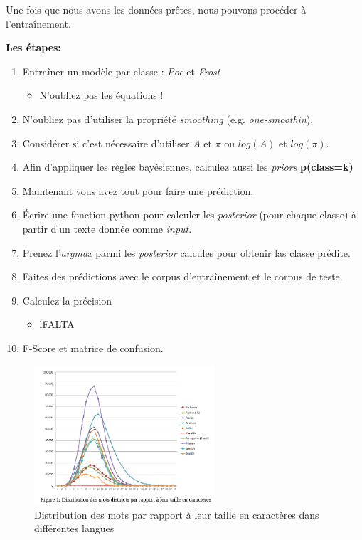 \vspace{0.5cm}
Une fois que nous avons les données prêtes, nous pouvons procéder à l'entraînement.

\vspace{0.5cm}
\textbf{Les étapes:}

\begin{enumerate}
	\item Entraîner un modèle par classe : \textit{Poe} et \textit{Frost}
	\begin{itemize}
		\item N'oubliez pas les équations !
	\end{itemize}
	\item N'oubliez pas d'utiliser la propriété \textit{smoothing} (e.g. \textit{one-smoothin}). 
	\item Considérer si c'est nécessaire d'utiliser $A$ et $\pi$ ou $log(A)$ et $log(\pi)$.
	\item Afin d'appliquer les règles bayésiennes, calculez aussi les \textit{priors} \textbf{p(class=k)}
	\item Maintenant vous avez tout pour faire une prédiction.
	\item Écrire une fonction python pour calculer les \textit{posterior} (pour chaque classe) à partir d'un texte donnée comme \textit{input}.
	\item Prenez l'\textit{argmax} parmi les \textit{posterior} calcules pour obtenir las classe prédite.
	\item Faites des prédictions avec le corpus d'entraînement et le corpus de teste.
	\item Calculez la précision 
	\begin{itemize}
		\item lFALTA
	\end{itemize}
	\item F-Score et matrice de confusion.
	
\end{enumerate}

\begin{figure}[h]
\includegraphics[width=0.6\textwidth]{../images/distrib.png}
\caption{Distribution des mots par rapport à leur taille en caractères dans
différentes langues\label{distrib}}
\end{figure}

